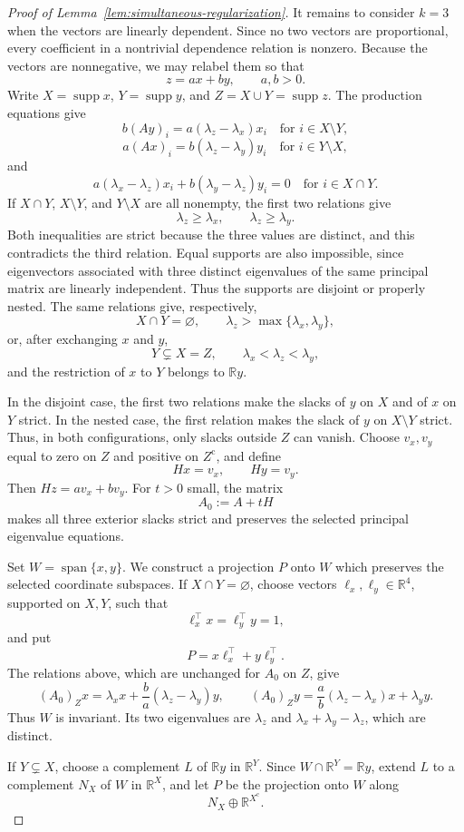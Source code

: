 \documentclass[10pt,a4paper]{amsart}
\newcommand{\R}{\mathbb R}
\newcommand{\supp}{\operatorname{supp}}
\begin{document}
\begin{proof}[Proof of Lemma~\ref{lem:simultaneous-regularization}]
It remains to consider $k=3$ when the vectors are linearly dependent.
Since no two vectors are proportional, every coefficient in a
nontrivial dependence relation is nonzero. Because the vectors are
nonnegative, we may relabel them so that
$$
z=ax+by,
\qquad
a,b>0.
$$
Write $X=\supp x$, $Y=\supp y$, and
$Z=X\cup Y=\supp z$. The production equations give
$$
b(Ay)_i=a(\lambda_z-\lambda_x)x_i
\quad\text{for }i\in X\setminus Y,
$$
$$
a(Ax)_i=b(\lambda_z-\lambda_y)y_i
\quad\text{for }i\in Y\setminus X,
$$
and
$$
a(\lambda_x-\lambda_z)x_i
+
b(\lambda_y-\lambda_z)y_i=0
\quad\text{for }i\in X\cap Y.
$$
If $X\cap Y$, $X\setminus Y$, and $Y\setminus X$ are all nonempty,
the first two relations give
$$
\lambda_z\geq\lambda_x,
\qquad
\lambda_z\geq\lambda_y.
$$
Both inequalities are strict because the three values are distinct,
and this contradicts the third relation. Equal supports are also
impossible, since eigenvectors associated with three distinct
eigenvalues of the same principal matrix are linearly independent.
Thus the supports are disjoint or properly nested. The same relations
give, respectively,
$$
X\cap Y=\varnothing,
\qquad
\lambda_z>\max\{\lambda_x,\lambda_y\},
$$
or, after exchanging $x$ and $y$,
$$
Y\subsetneq X=Z,
\qquad
\lambda_x<\lambda_z<\lambda_y,
$$
and the restriction of $x$ to $Y$ belongs to $\R y$.

In the disjoint case, the first two relations make the slacks of $y$
on $X$ and of $x$ on $Y$ strict. In the nested case, the first
relation makes the slack of $y$ on $X\setminus Y$ strict. Thus, in
both configurations, only slacks outside $Z$ can vanish. Choose
$v_x,v_y$ equal to zero on $Z$ and positive on $Z^{\mathrm c}$, and
define
$$
Hx=v_x,
\qquad
Hy=v_y.
$$
Then $Hz=av_x+bv_y$. For $t>0$ small, the matrix
$$
A_0:=A+tH
$$
makes all three exterior slacks strict and preserves the selected
principal eigenvalue equations.

Set $W=\operatorname{span}\{x,y\}$. We construct a projection $P$ onto
$W$ which preserves the selected coordinate subspaces. If
$X\cap Y=\varnothing$, choose vectors
$\ell_x,\ell_y\in\R^4$, supported on $X,Y$, such that
$$
\ell_x^\top x=\ell_y^\top y=1,
$$
and put
$$
P=x\ell_x^\top+y\ell_y^\top.
$$
The relations above, which are unchanged for $A_0$ on $Z$, give
$$
(A_0)_Zx
=
\lambda_xx+\frac ba(\lambda_z-\lambda_y)y,
\qquad
(A_0)_Zy
=
\frac ab(\lambda_z-\lambda_x)x+\lambda_yy.
$$
Thus $W$ is invariant. Its two eigenvalues are $\lambda_z$ and
$\lambda_x+\lambda_y-\lambda_z$, which are distinct.

If $Y\subsetneq X$, choose a complement $L$ of $\R y$ in $\R^Y$.
Since $W\cap\R^Y=\R y$, extend $L$ to a complement $N_X$ of $W$ in
$\R^X$, and let $P$ be the projection onto $W$ along
$$
N_X\oplus\R^{X^{\mathrm c}}.
$$


\end{proof}
\end{document}
